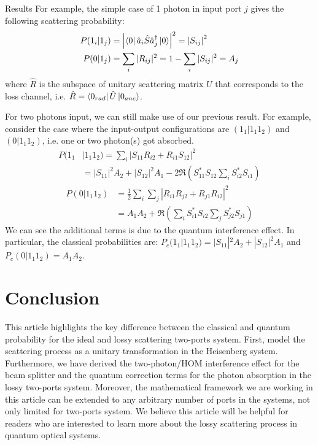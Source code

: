\documentclass[%
 aps,
 reprint,
 twocolumn,
 amsmath,amssymb,
floatfix,
]{revtex4-2}
\begin{document}
\begin{section}{Results}
For example, the simple case of 1 photon in input port $j$ gives the following scattering probability:
\begin{align}
	P(1_i | 1_j) & = \left| \bra{0} \hat{a}_i \hat{S} \hat{a}_j^\dagger \ket{0} \right|^2 = \left| S_{ij} \right|^2 \\
	P(0 | 1_j)   & = \sum_{i} |R_{ij}|^2  = 1 - \sum_{i} |S_{ij}|^2 = A_j
\end{align}
where $\hat{R}$ is the subspace of unitary scattering matrix $U$ that corresponds to the loss channel, i.e. $\hat{R} = \bra{0_{rad}} \hat{U} \ket{0_{anc}}$.

For two photons input, we can still make use of our previous result. For example, consider the case where the input-output configurations are $(1_1 | 1_1 1_2)$ and $(0 | 1_1 1_2)$, i.e. one or two photon(s) got absorbed.
\begin{align*}
	P(1_1 &| 1_1 1_2)  = \sum_i \left| S_{11} R_{i2} + R_{i1} S_{12} \right|^2 \\
	                  &= |S_{11}|^2 A_2 + |S_{12}|^2 A_1 - 2 \Re\left( S_{11}^* S_{12} \sum_i  S_{i2}^* S_{i1} \right)                               
\end{align*}
\begin{align*}
	P(0 | 1_1 1_2) & = \frac{1}{2} \sum_i \sum_j \left| R_{i1} R_{j2} + R_{j1} R_{i2} \right|^2  \\
	               & = A_1A_2 + \Re\left( \sum_i S_{i1}^* S_{i2} \sum_j S_{j2}^* S_{j1}  \right)
\end{align*}
We can see the additional terms is due to the quantum interference effect. In particular, the classical probabilities are: $P_c(1_1 | 1_1 1_2) = |S_{11}|^2 A_2 + |S_{12}|^2 A_1$ and $P_c(0 | 1_1 1_2) = A_1A_2$. 
\end{section}

\bigskip
\section{Conclusion}
This article highlights the key difference between the classical and quantum probability for the ideal and lossy scattering two-ports system. First, model the scattering process as a unitary transformation in the Heisenberg system. Furthermore, we have derived the two-photon/HOM interference effect for the beam splitter and the quantum correction terms for the photon absorption in the lossy two-ports system. Moreover, the mathematical framework we are working in this article can be extended to any arbitrary number of ports in the systems, not only limited for two-ports system. We believe this article will be helpful for readers who are interested to learn more about the lossy scattering process in quantum optical systems.
\end{document}

